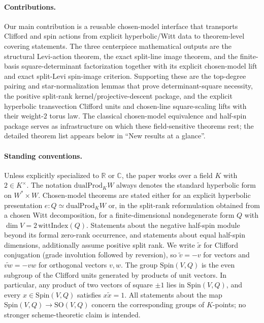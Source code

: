 \documentclass[11pt,a4paper]{article}
\theoremstyle{plain}
\theoremstyle{definition}
\theoremstyle{remark}
\newcommand{\Spin}{\mathrm{Spin}}
\newcommand{\SO}{\mathrm{SO}}
\newcommand{\dualProd}{\mathrm{dualProd}}
\begin{document}
\paragraph{Contributions.}
Our main contribution is a reusable chosen-model interface that transports
Clifford and spin actions from explicit hyperbolic/Witt data to theorem-level
covering statements. The three centerpiece mathematical outputs are the
structural Levi-action theorem, the exact split-line image theorem, and the
finite-basis square-determinant factorization together with its explicit
chosen-model lift and exact split-Levi spin-image criterion. Supporting these
are the top-degree pairing and star-normalization lemmas that prove
determinant-square necessity, the positive split-rank kernel/projective-descent
package, and the explicit hyperbolic transvection Clifford units and chosen-line
square-scaling lifts with their weight-$2$ torus law. The classical
chosen-model equivalence and half-spin package serves as infrastructure on
which these field-sensitive theorems rest; the detailed theorem list appears
below in ``New results at a glance''.

\paragraph{Standing conventions.}
Unless explicitly specialized to $\mathbb{R}$ or $\mathbb{C}$, the paper works
over a field $K$ with $2\in K^\times$. The notation $\dualProd_K W$ always
denotes the standard hyperbolic form on $W^* \times W$. Chosen-model theorems
are stated either for an explicit hyperbolic presentation
$e:Q \simeq \dualProd_K W$ or, in the split-rank reformulation obtained from a
chosen Witt decomposition, for a
finite-dimensional nondegenerate form $Q$ with
$\dim V = 2\,\mathrm{wittIndex}(Q)$. Statements about the negative half-spin
module beyond its formal zero-rank occurrence, and statements about equal
half-spin dimensions, additionally assume positive split rank.
We write $\tilde x$ for Clifford conjugation (grade involution followed by
reversion), so $\tilde v=-v$ for vectors and $\widetilde{vw}=-vw$ for
orthogonal vectors $v,w$. The group $\Spin(V,Q)$ is the even subgroup of the
Clifford units generated by products of unit vectors. In particular, any
product of two vectors of square $\pm1$ lies in $\Spin(V,Q)$, and every
$x\in \Spin(V,Q)$ satisfies $x\tilde x=1$.
All statements about the map $\Spin(V,Q)\to\SO(V,Q)$ concern the corresponding
groups of $K$-points; no stronger scheme-theoretic claim is intended.
\end{document}
